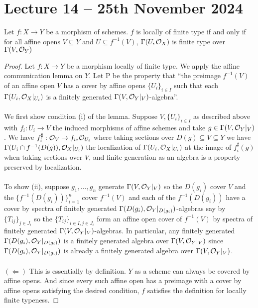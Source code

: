 \section{Lecture 14 -- 25th November 2024}\label{sec: lecture 14}
\begin{proposition}
    Let $f:X\to Y$ be a morphism of schemes. $f$ is locally of finite type if and only if for all affine opens $V\subseteq Y$ and $U\subseteq f^{-1}(V)$, $\Gamma(U,\mathcal{O}_{X})$ is finite type over $\Gamma(V,\mathcal{O}_{Y})$
\end{proposition}
\begin{proof}
    Let $f:X\to Y$ be a morphism locally of finite type. We apply the affine communication lemma  on $Y$. Let P be the property that ``the preimage $f^{-1}(V)$ of an affine open $V$ has a cover by affine opens $\{U_{i}\}_{i\in I}$ such that each $\Gamma(U_{i},\mathcal{O}_{X}|_{U_{i}})$ is a finitely generated $\Gamma(V,\mathcal{O}_{Y}|_{V})$-algebra''.
    \\\\
    We first show condition (i) of the lemma. Suppose $V,\{U_{i}\}_{i\in I}$ as described above with $f_{i}:U_{i}\to V$ the induced morphisms of affine schemes and take $g\in\Gamma(V,\mathcal{O}_{Y}|_{V})$. We have $f_{i}^{\sharp}:\mathcal{O}_{V}\to f_{i*}\mathcal{O}_{U_{i}}$ where taking sections over $D(g)\subseteq V\subseteq Y$ we have $\Gamma(U_{i}\cap f^{-1}(D(g)),\mathcal{O}_{X}|_{U_{i}})$ the localization of $\Gamma(U_{i},\mathcal{O}_{X}|_{U_{i}})$ at the image of $f_{i}^{\sharp}(g)$ when taking sections over $V$, and finite generation as an algebra is a property preserved by localization. 
    \\\\
    To show (ii), suppose $g_{1},\dots,g_{n}$ generate $\Gamma(V,\mathcal{O}_{Y}|_{V})$ so the $D(g_{i})$ cover $V$ and the $\{f^{-1}(D(g_{i}))\}_{i=1}^{n}$ cover $f^{-1}(V)$ and each of the $f^{-1}(D(g_{i}))$ have a cover by spectra of finitely generated $\Gamma(D(g_{i}),\mathcal{O}_{Y}|_{D(g_{i})})$-algebras say by $\{T_{ij}\}_{j\in J_{i}}$ so the $\{T_{ij}\}_{i\in I, j\in J_{i}}$ form an affine open cover of $f^{-1}(V)$ by spectra of finitely generated $\Gamma(V,\mathcal{O}_{Y}|_{V})$-algebras. In particular, any finitely generated $\Gamma(D(g_{i}),\mathcal{O}_{Y}|_{D(g_{i})})$ is a finitely generated algebra over $\Gamma(V,\mathcal{O}_{Y}|_{V})$ since $\Gamma(D(g_{i}),\mathcal{O}_{Y}|_{D(g_{i})})$ is already a finitely generated algebra over $\Gamma(V,\mathcal{O}_{Y}|_{V})$.
    \\\\
    $(\Longleftarrow)$ This is essentially by definition. $Y$ as a scheme can always be covered by affine opens. And since every such affine open has a preimage with a cover by affine opens satisfying the desired condition, $f$ satisfies the definition for locally finite typeness. 
\end{proof}